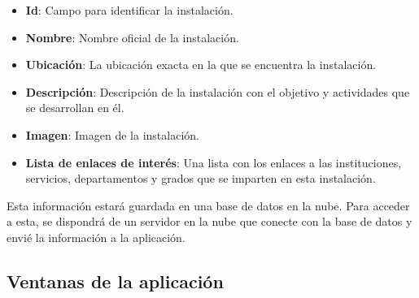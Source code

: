 \begin{itemize}
    \item \textbf{Id}: Campo para identificar la instalación.
    \item \textbf{Nombre}: Nombre oficial de la instalación.
    \item \textbf{Ubicación}: La ubicación exacta en la que se encuentra la instalación. 
    \item \textbf{Descripción}: Descripción de la instalación con el objetivo y actividades que se desarrollan en él.
    \item \textbf{Imagen}: Imagen de la instalación.
    \item \textbf{Lista de enlaces de interés}: Una lista con los enlaces a las instituciones, servicios, departamentos y grados que se imparten en esta instalación.
\end{itemize}

Esta información estará guardada en una base de datos en la nube. Para acceder a esta, se dispondrá de un servidor en la nube que conecte con la base de datos y envié la información a la aplicación.

\subsection{Ventanas de la aplicación}

 

  

